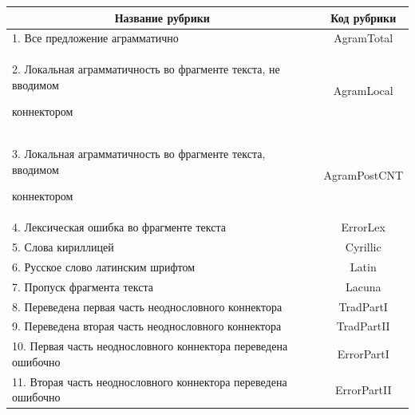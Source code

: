    


   \begin{table}\small %


\begin{center}




\vspace*{2ex}





\begin{tabular}{|l|c|}


\hline


\multicolumn{1}{|c|}{Название рубрики}&Код рубрики\\ 


\hline


\hphantom{9}1. Все предложение аграмматично&AgramTotal\\


\hphantom{9}2. Локальная аграмматичность во фрагменте текста, не вводимом 


коннектором&AgramLocal\\ 


\hphantom{9}3. Локальная аграмматичность во фрагменте текста, вводимом 


коннектором&AgramPostCNT\\ 


\hphantom{9}4. Лексическая ошибка во фрагменте текста&ErrorLex\\ 


\hphantom{9}5. Слова кириллицей&Cyrillic\\ 


\hphantom{9}6. Русское слово латинским шрифтом&Latin\\ 


\hphantom{9}7. Пропуск фрагмента текста&Lacuna\\ 


\hphantom{9}8. Переведена первая часть неоднословного коннектора&TradPartI\\ 


\hphantom{9}9. Переведена вторая часть неоднословного коннектора&TradPartII\\ 


10. Первая часть неоднословного коннектора переведена ошибочно&ErrorPartI\\ 


11. Вторая часть неоднословного коннектора переведена ошибочно&ErrorPartII\\ 



\end{tabular}
\end{center}
\end{table}
